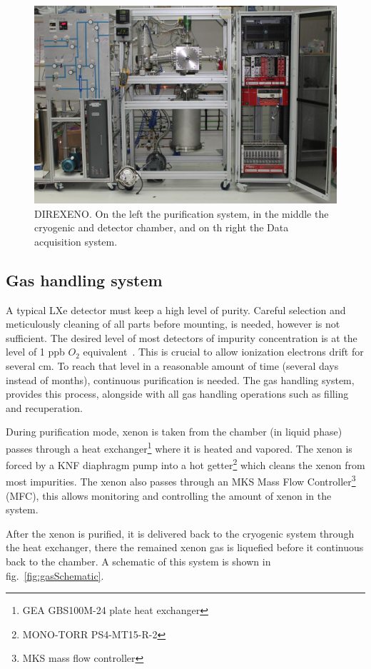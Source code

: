 \begin{figure}[t!]
\centerline{\includegraphics[width=0.8\linewidth]{FullDet.jpg}}
\caption{DIREXENO. On the left the purification system, in the middle the cryogenic and detector chamber, and on th right the Data acquisition system.}
\label{fig:fulldet}
\end{figure}

\subsection{Gas handling system}
\label{subsec:gas}

A typical LXe detector must keep a high level of purity. Careful selection and meticulously cleaning of all parts before mounting, is needed, however is not sufficient. The desired level of most detectors of impurity concentration is at the level of 1 ppb $O_2$ equivalent~\cite{Aprile:2009dv}. This is crucial to allow ionization electrons drift for several cm. To reach that level in a 
reasonable amount of time (several days instead of months), continuous purification is needed. The gas handling system, provides this process, 
alongside with all gas handling operations such as filling and recuperation.

During purification mode, xenon is taken from the chamber (in liquid phase)
passes through a heat exchanger\footnote{GEA GBS100M-24 plate heat exchanger} where it is heated and vapored. The xenon is forced 
by a KNF diaphragm pump into a hot getter\footnote{MONO-TORR
PS4-MT15-R-2} which cleans the xenon from most impurities. The xenon
also passes through an MKS Mass Flow Controller\footnote{MKS mass flow controller} (MFC), this allows monitoring and controlling the amount of xenon in the system. 

After the xenon is purified, it is delivered back to the cryogenic system through the heat exchanger, there the remained xenon gas is 
liquefied before it continuous back to the chamber. A schematic of this system is shown in fig.~\ref{fig:gasSchematic}.


